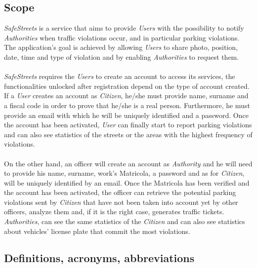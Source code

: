 \documentclass{article}
\begin{document}
\subsection{Scope}
\textit{SafeStreets} is a service that aims to provide \textit{Users} with the possibility to notify \textit{Authorities} when traffic 
violations occur, and in particular parking violations. The application's goal is achieved by allowing \textit{Users} 
to share photo, position, date, time and type of violation and by enabling \textit{Authorities} to request them.
\\
\\
\textit{SafeStreets} requires the \textit{Users} to create an account to access its services, the functionalities unlocked after 
registration depend on the type of account created.
\\
If a \textit{User} creates an account as \textit{Citizen}, he/she must provide name, surname and a fiscal code in order to prove 
that he/she is a real person. Furthermore, he must provide an email with which he will be uniquely identified 
and a password. Once the account has been activated, \textit{User} can finally start to report parking violations and can also see 
statistics of the streets or the areas with the highest frequency of violations.
\\
\\
On the other hand, an officer will create an account as \textit{Authority} and he will need to provide his name, surname, 
work's Matricola, a password and as for \textit{Citizen}, will be uniquely identified by an email. Once the Matricola 
has been verified and the account has been activated, the officer can retrieve the potential parking violations 
sent by \textit{Citizen} that have not been taken into account yet by other officers, analyze them and, if it is the 
right case, generates traffic tickets. \textit{Authorities}, can see the same statistics of the \textit{Citizen} and can also see
statistics about vehicles' license plate that commit the most violations.


\subsection{Definitions, acronyms, abbreviations}
\end{document}
